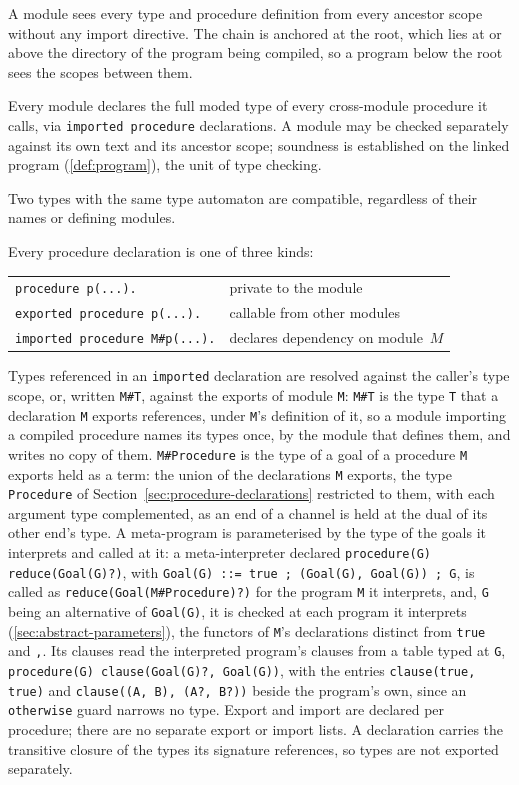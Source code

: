 A module sees every type and procedure definition from every ancestor scope without any import directive.  The chain is anchored at the root, which lies at or above the directory of the program being compiled, so a program below the root sees the scopes between them.

Every module declares the full moded type of every cross-module procedure it calls, via \verb|imported procedure| declarations.  A module may be checked separately against its own text and its ancestor scope; soundness is established on the linked program (\cref{def:program}), the unit of type checking.

Two types with the same type automaton are compatible, regardless of their names or defining modules.

Every procedure declaration is one of three kinds:

\begin{center}
\begin{tabular}{ll}
\verb|procedure p(...).| & private to the module \\
\verb|exported procedure p(...).| & callable from other modules \\
\verb|imported procedure M#p(...).| & declares dependency on module~$M$ \\
\end{tabular}
\end{center}

Types referenced in an \verb|imported| declaration are resolved against the caller's type scope, or, written \verb|M#T|, against the exports of module \verb|M|: \verb|M#T| is the type \verb|T| that a declaration \verb|M| exports references, under \verb|M|'s definition of it, so a module importing a compiled procedure names its types once, by the module that defines them, and writes no copy of them.  \verb|M#Procedure| is the type of a goal of a procedure \verb|M| exports held as a term: the union of the declarations \verb|M| exports, the type \verb|Procedure| of Section~\ref{sec:procedure-declarations} restricted to them, with each argument type complemented, as an end of a channel is held at the dual of its other end's type.  A meta-program is parameterised by the type of the goals it interprets and called at it: a meta-interpreter declared \verb|procedure(G) reduce(Goal(G)?)|, with \verb|Goal(G) ::= true ; (Goal(G), Goal(G)) ; G|, is called as \verb|reduce(Goal(M#Procedure)?)| for the program \verb|M| it interprets, and, \verb|G| being an alternative of \verb|Goal(G)|, it is checked at each program it interprets (\cref{sec:abstract-parameters}), the functors of \verb|M|'s declarations distinct from \verb|true| and \verb|,|.  Its clauses read the interpreted program's clauses from a table typed at \verb|G|, \verb|procedure(G) clause(Goal(G)?, Goal(G))|, with the entries \verb|clause(true, true)| and \verb|clause((A, B), (A?, B?))| beside the program's own, since an \verb|otherwise| guard narrows no type.  Export and import are declared per procedure; there are no separate export or import lists.  A declaration carries the transitive closure of the types its signature references, so types are not exported separately.

